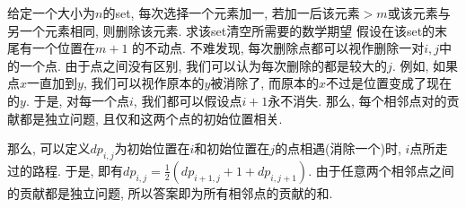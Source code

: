 \prob 给定一个大小为$n$的set, 每次选择一个元素加一, 若加一后该元素$> m$或该元素与另一个元素相同, 则删除该元素. 求该set清空所需要的数学期望
\sol 假设在该set的末尾有一个位置在$m + 1$ 的不动点. 不难发现, 每次删除点都可以视作删除一对$i,j$中的一个点. 由于点之间没有区别, 我们可以认为每次删除的都是较大的$j$. 例如, 如果点$x$一直加到$y$, 我们可以视作原本的$y$被消除了, 而原本的$x$不过是位置变成了现在的$y$. 于是, 对每一个点$i$, 我们都可以假设点$i+1$永不消失. 那么, 每个相邻点对的贡献都是独立问题, 且仅和这两个点的初始位置相关.

那么, 可以定义$dp_{i,j}$为初始位置在$i$和初始位置在$j$的点相遇(消除一个)时, $i$点所走过的路程. 于是, 即有$dp_{i,j} = \frac{1}{2}(dp_{i+1, j} + 1 + dp_{i, j+1})$. 由于任意两个相邻点之间的贡献都是独立问题, 所以答案即为所有相邻点的贡献的和.